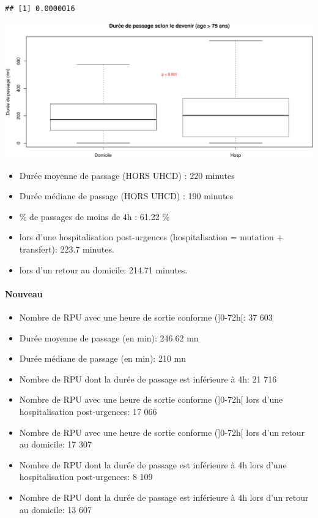 \documentclass[]{article}
\begin{document}
\begin{verbatim}
## [1] 0.0000016
\end{verbatim}

\includegraphics{Figs/duree_passage_75-1.pdf}

\begin{itemize}
\itemsep1pt\parskip0pt
\item
  Durée moyenne de passage (HORS UHCD) : 220 minutes
\item
  Durée médiane de passage (HORS UHCD) : 190 minutes
\item
  \% de passages de moins de 4h : 61.22 \%
\item
  lors d'une hospitalisation post-urgences (hospitalisation = mutation +
  transfert): 223.7 minutes.
\item
  lors d'un retour au domicile: 214.71 minutes.
\end{itemize}

\paragraph{Nouveau}\label{nouveau}

\begin{itemize}
\item
  Nombre de RPU avec une heure de sortie conforme ({]}0-72h{[}: 37 603
\item
  Durée moyenne de passage (en min): 246.62 mn
\item
  Durée médiane de passage (en min): 210 mn
\item
  Nombre de RPU dont la durée de passage est inférieure à 4h: 21 716
\item
  Nombre de RPU avec une heure de sortie conforme ({]}0-72h{[} lors
  d'une hospitalisation post-urgences: 17 066
\item
  Nombre de RPU avec une heure de sortie conforme ({]}0-72h{[} lors d'un
  retour au domicile: 17 307
\item
  Nombre de RPU dont la durée de passage est inférieure à 4h lors d'une
  hospitalisation post-urgences: 8 109
\item
  Nombre de RPU dont la durée de passage est inférieure à 4h lors d'un
  retour au domicile: 13 607
\end{itemize}
\end{document}

